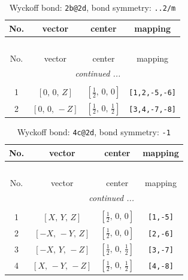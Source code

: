 \documentclass[fleqn,8pt]{jsarticle}
\begin{document}
\renewcommand{\arraystretch}{1.2}
\begin{longtable}{cccc}
\caption{Wyckoff bond: {\tt 2b@2d}, bond symmetry: {\tt ..2/m}}
 \\
 \hline \hline
No. & vector & center & mapping \\ \hline \endfirsthead

\multicolumn{3}{l}{\tablename\ \thetable{}} \\
 \hline \hline
No. & vector & center & mapping \\ \hline \endhead

 \hline \hline
\multicolumn{3}{r}{\footnotesize\it continued ...} \\ \endfoot

 \hline \hline
\multicolumn{3}{r}{} \\ \endlastfoot

1 & $\left[ 0,\, 0,\, Z \right]$ & $\left[ \frac{1}{2},\, 0,\, 0 \right]$ & {\tt [1,2,-5,-6]} \\ \hline
2 & $\left[ 0,\, 0,\, - Z \right]$ & $\left[ \frac{1}{2},\, 0,\, \frac{1}{2} \right]$ & {\tt [3,4,-7,-8]} \\
\end{longtable}
\renewcommand{\arraystretch}{1.2}
\begin{longtable}{cccc}
\caption{Wyckoff bond: {\tt 4c@2d}, bond symmetry: {\tt -1}}
 \\
 \hline \hline
No. & vector & center & mapping \\ \hline \endfirsthead

\multicolumn{3}{l}{\tablename\ \thetable{}} \\
 \hline \hline
No. & vector & center & mapping \\ \hline \endhead

 \hline \hline
\multicolumn{3}{r}{\footnotesize\it continued ...} \\ \endfoot

 \hline \hline
\multicolumn{3}{r}{} \\ \endlastfoot

1 & $\left[ X,\, Y,\, Z \right]$ & $\left[ \frac{1}{2},\, 0,\, 0 \right]$ & {\tt [1,-5]} \\ \hline
2 & $\left[ - X,\, - Y,\, Z \right]$ & $\left[ \frac{1}{2},\, 0,\, 0 \right]$ & {\tt [2,-6]} \\ \hline
3 & $\left[ - X,\, Y,\, - Z \right]$ & $\left[ \frac{1}{2},\, 0,\, \frac{1}{2} \right]$ & {\tt [3,-7]} \\ \hline
4 & $\left[ X,\, - Y,\, - Z \right]$ & $\left[ \frac{1}{2},\, 0,\, \frac{1}{2} \right]$ & {\tt [4,-8]} \\
\end{longtable}
\end{document}
